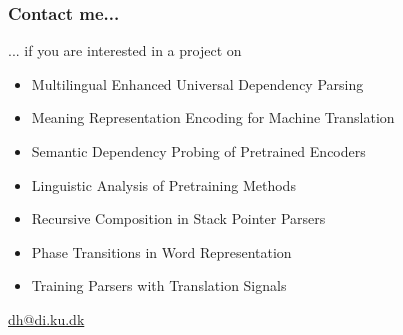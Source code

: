 \documentclass[t,xcolor={svgnames,table}]{beamer}
\begin{document}
\begin{frame}
\frametitle{Contact me...}
... if you are interested in a project on
\begin{itemize}
\item Multilingual Enhanced Universal Dependency Parsing
\item Meaning Representation Encoding for Machine Translation
\item Semantic Dependency Probing of Pretrained Encoders
\item Linguistic Analysis of Pretraining Methods
\item Recursive Composition in Stack Pointer Parsers
\item Phase Transitions in Word Representation
\item Training Parsers with Translation Signals
\end{itemize}
\vfill
{\Huge\url{dh@di.ku.dk}}
\end{frame}
\end{document}
